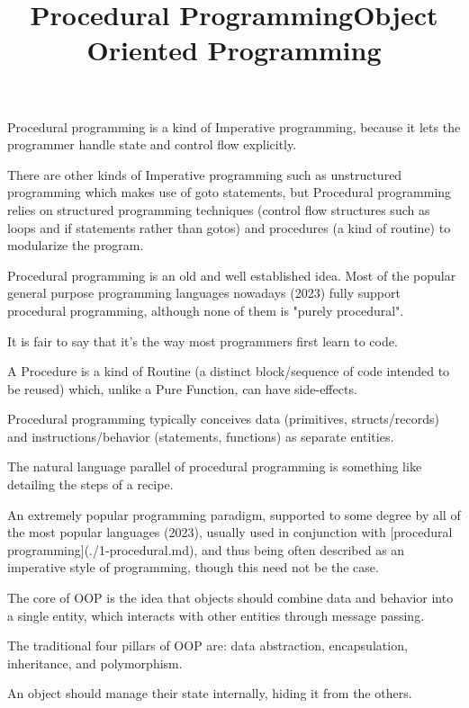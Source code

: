 \title{Procedural Programming}

Procedural programming is a kind of Imperative programming, because it lets the programmer handle state and control flow explicitly.

There are other kinds of Imperative programming such as unstructured programming which makes use of goto statements, but Procedural programming relies on structured programming techniques (control flow structures such as loops and if statements rather than gotos) and procedures (a kind of routine) to modularize the program.

Procedural programming is an old and well established idea. Most of the popular general purpose programming languages nowadays (2023) fully support procedural programming, although none of them is "purely procedural". 

It is fair to say that it's the way most programmers first learn to code.

A Procedure is a kind of Routine (a distinct block/sequence of code intended to be reused) which, unlike a Pure Function, can have side-effects.

Procedural programming typically conceives data (primitives, structs/records) and instructions/behavior (statements, functions) as separate entities.

The natural language parallel of procedural programming is something like detailing the steps of a recipe.



\title{Object Oriented Programming}

An extremely popular programming paradigm, supported to some degree by all of the most popular languages (2023), usually used in conjunction with [procedural programming](./1-procedural.md), and thus being often described as an imperative style of programming, though this need not be the case.

The core of OOP is the idea that objects should combine data and behavior into a single entity, which interacts with other entities through message passing. 

The traditional four pillars of OOP are: data abstraction, encapsulation, inheritance, and polymorphism.

An object should manage their state internally, hiding it from the others.

